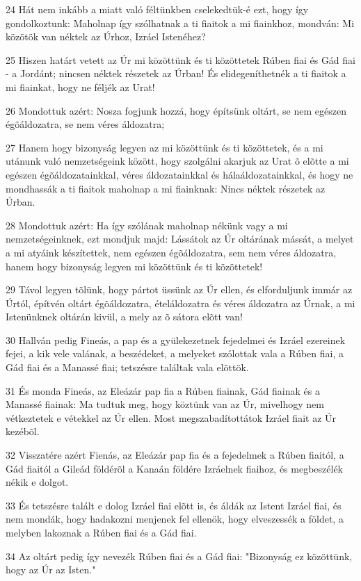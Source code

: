 \par 24 Hát nem inkább a miatt való féltünkben cselekedtük-é ezt, hogy így gondolkoztunk: Maholnap így szólhatnak a ti fiaitok a mi fiainkhoz, mondván: Mi közötök van néktek az Úrhoz, Izráel Istenéhez?
\par 25 Hiszen határt vetett az Úr mi közöttünk és ti közöttetek Rúben fiai és Gád fiai - a Jordánt; nincsen néktek részetek az Úrban! És elidegeníthetnék a ti fiaitok a mi fiainkat, hogy ne féljék az Urat!
\par 26 Mondottuk azért: Nosza fogjunk hozzá, hogy építsünk oltárt, se nem egészen égõáldozatra, se nem véres áldozatra;
\par 27 Hanem hogy bizonyság legyen az mi közöttünk és ti közöttetek, és a mi utánunk való nemzetségeink között, hogy szolgálni akarjuk az Urat õ elõtte a mi egészen égõáldozatainkkal, véres áldozatainkkal és hálaáldozatainkkal, és hogy ne mondhassák a ti fiaitok maholnap a mi fiainknak: Nincs néktek részetek az Úrban.
\par 28 Mondottuk azért: Ha így szólának maholnap nékünk vagy a mi nemzetségeinknek, ezt mondjuk majd: Lássátok az Úr oltárának mássát, a melyet a mi atyáink készítettek, nem egészen égõáldozatra, sem nem véres áldozatra, hanem hogy bizonyság legyen mi közöttünk és ti közöttetek!
\par 29 Távol legyen tõlünk, hogy pártot üssünk az Úr ellen, és elforduljunk immár az Úrtól, építvén oltárt égõáldozatra, ételáldozatra és véres áldozatra az Úrnak, a mi Istenünknek oltárán kivül, a mely az õ sátora elõtt van!
\par 30 Hallván pedig Fineás, a pap és a gyülekezetnek fejedelmei és Izráel ezereinek fejei, a kik vele valának, a beszédeket, a melyeket szólottak vala a Rúben fiai, a Gád fiai és a Manassé fiai; tetszésre találtak vala elõttök.
\par 31 És monda Fineás, az Eleázár pap fia a Rúben fiainak, Gád fiainak és a Manassé fiainak: Ma tudtuk meg, hogy köztünk van az Úr, mivelhogy nem vétkeztetek e vétekkel az Úr ellen. Most megszabadítottátok Izráel fiait az Úr kezébõl.
\par 32 Visszatére azért Fienás, az Eleázár pap fia és a fejedelmek a Rúben fiaitól, a Gád fiaitól a Gileád földérõl a Kanaán földére Izráelnek fiaihoz, és megbeszélék nékik e dolgot.
\par 33 És tetszésre talált e dolog Izráel fiai elõtt is, és áldák az Istent Izráel fiai, és nem mondák, hogy hadakozni menjenek fel ellenök, hogy elveszessék a földet, a melyben lakoznak a Rúben fiai és a Gád fiai.
\par 34 Az oltárt pedig így nevezék Rúben fiai és a Gád fiai: "Bizonyság ez közöttünk, hogy az Úr az Isten."

